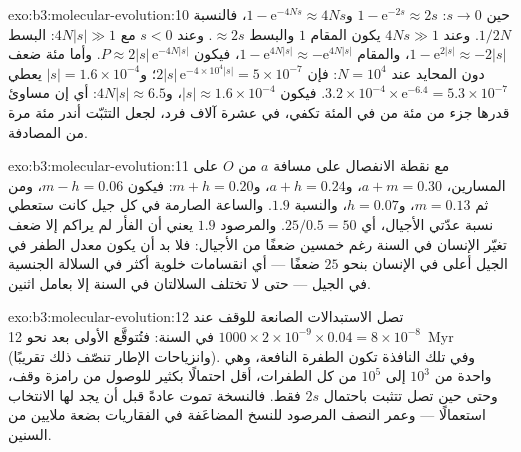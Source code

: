 \begin{solution}{exo:b3:molecular-evolution:10}
حين $s \to 0$: $1 - \mathrm{e}^{-2s} \approx 2s$ و$1 - \mathrm{e}^{-4Ns}
\approx 4Ns$، فالنسبة $1/2N$. وعند $4Ns \gg 1$ يكون المقام $1$ والبسط
$\approx 2s$. وعند $s < 0$ مع $4N|s| \gg 1$: البسط $1 -
\mathrm{e}^{2|s|} \approx -2|s|$، والمقام $1 - \mathrm{e}^{4N|s|} \approx
-\mathrm{e}^{4N|s|}$، فيكون $P \approx 2|s|\,\mathrm{e}^{-4N|s|}$. وأما مئة ضعف
دون المحايد عند $N = 10^{4}$: فإن $2|s|\,\mathrm{e}^{-4\times 10^{4}|s|} =
5\times 10^{-7}$؛ و$|s| = 1.6\times 10^{-4}$ يعطي $3.2\times 10^{-4}\times
\mathrm{e}^{-6.4} = 5.3\times 10^{-7}$. فيكون $|s| \approx 1.6\times 10^{-4}$،
و$4N|s| \approx 6.5$: أي إن مساوئ قدرها جزء من مئة من في المئة
تكفي، في عشرة آلاف فرد، لجعل التثبّت أندر مئة مرة
من المصادفة.
\end{solution}

\begin{solution}{exo:b3:molecular-evolution:11}
مع نقطة الانفصال على مسافة $a$ من $O$ على المسارين، $a + m =
0.30$، و$a + h = 0.24$، و$m + h = 0.20$: فيكون $m - h = 0.06$، ومن ثم $m = 0.13$، و$h
= 0.07$، والنسبة $1.9$. والساعة الصارمة في كل جيل كانت ستعطي
نسبة عدّتي الأجيال، أي $25/0.5 = 50$. والمرصود $1.9$ يعني أن
الفأر لم يراكم إلا ضعف تغيّر الإنسان في السنة رغم
خمسين ضعفًا من الأجيال: فلا بد أن يكون معدل الطفر في الجيل
أعلى في الإنسان بنحو $25$ ضعفًا --- أي انقسامات خلوية أكثر في
السلالة الجنسية في الجيل --- حتى لا تختلف السلالتان في السنة
إلا بعامل اثنين.
\end{solution}

\begin{solution}{exo:b3:molecular-evolution:12}
تصل الاستبدالات الصانعة للوقف عند $1000\times 2\times 10^{-9}\times
0.04 = 8\times 10^{-8}$ في السنة: فتُتوقَّع الأولى بعد نحو
\qty{12}{Myr} (وانزياحات الإطار تنصّف ذلك تقريبًا). وفي تلك
النافذة تكون الطفرة النافعة، وهي واحدة من $10^{3}$ إلى $10^{5}$ من كل الطفرات، أقل
احتمالًا بكثير للوصول من رامزة وقف، وحتى حين تصل
تتثبت باحتمال $2s$ فقط. فالنسخة تموت عادةً قبل أن
يجد لها الانتخاب استعمالًا --- وعمر النصف المرصود للنسخ
المضاعَفة في الفقاريات بضعة ملايين من السنين.
\end{solution}

